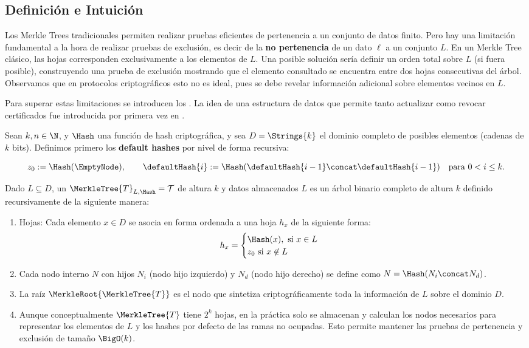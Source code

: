 
\subsection{Definición e Intuición}

Los Merkle Trees tradicionales permiten realizar pruebas eficientes de pertenencia a un conjunto de datos finito. Pero hay una limitación fundamental a la hora de realizar pruebas de exclusión, es decir de la \textbf{no pertenencia} de un dato $\ell$ a un conjunto $L$. En un Merkle Tree clásico, las hojas corresponden exclusivamente a los elementos de $L$. Una posible solución sería definir un orden total sobre $L$ (si fuera posible), construyendo una prueba de exclusión mostrando que el elemento consultado se encuentra entre dos hojas consecutivas del árbol. Observamos que en protocolos criptográficos esto no es ideal, pues se debe revelar información adicional sobre elementos vecinos en $L$.

Para superar estas limitaciones se introducen los \SMT. La idea de una estructura de datos que permite tanto actualizar como revocar certificados fue introducida por primera vez en \cite{Naor2000}.

\begin{definition}
	Sean $k, n \in \N$, y $\Hash$ una función de hash criptográfica, y sea $D = \Strings{k}$ el dominio completo de posibles elementos (cadenas de $k$ bits). Definimos primero los \textbf{default hashes} por nivel de forma recursiva:
	
	$$z_0 := \Hash(\EmptyNode), \qquad \defaultHash{i} := \Hash(\defaultHash{i-1} \concat \defaultHash{i-1}) \quad \text{para } 0 < i \leq k.$$
	
		Dado $L \subseteq D$, un \SMT $\MerkleTree{T}_{L,\Hash} = \mathcal{T}$ de altura $k$ y datos almacenados $L$ es un árbol binario completo de altura $k$ definido recursivamente de la siguiente manera:
	\begin{enumerate}
		\item Hojas: Cada elemento $x \in D$ se asocia en forma ordenada a una hoja $h_x$ de la siguiente forma:
		$$h_x = \begin{cases}
		\Hash(x), \text{ si } x \in L \\
		z_0 \text{ si } x \not\in L
		\end{cases}$$
		\item Cada nodo interno $N$ con hijos $N_i$ (nodo hijo izquierdo) y $N_d$ (nodo hijo derecho) se define como $N = \Hash(N_i \concat N_d)$.
		\item La raíz $\MerkleRoot{\MerkleTree{T}}$ es el nodo que sintetiza criptográficamente toda la información de $L$ sobre el dominio $D$.
		\item Aunque conceptualmente $\MerkleTree{T}$ tiene $2^k$ hojas, en la práctica solo se almacenan y calculan los nodos necesarios para representar los elementos de $L$ y los hashes por defecto de las ramas no ocupadas. Esto permite mantener las pruebas de pertenencia y exclusión de tamaño $\BigO(k)$.
	\end{enumerate}
\end{definition}

